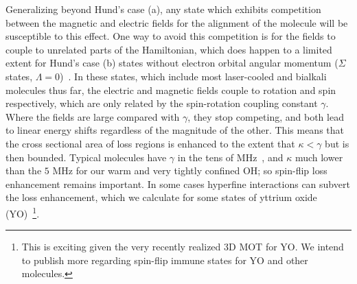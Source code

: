 \documentclass[%
 reprint,
 amsmath,amssymb,
 aps,
prl,
]{revtex4-1}
\begin{document}

%

Generalizing beyond Hund's case (a), any state which exhibits competition between the magnetic and electric fields for the alignment of the molecule will be susceptible to this effect. One way to avoid this competition is for the fields to couple to unrelated parts of the Hamiltonian, which does happen to a limited extent for Hund's case (b) states without electron orbital angular momentum ($\Sigma$ states, $\Lambda=0$)~\cite{Bohn2013}. In these states, which include most laser-cooled and bialkali molecules thus far, the electric and magnetic fields couple to rotation and spin respectively, which are only related by the spin-rotation coupling constant $\gamma$. Where the fields are large compared with $\gamma$, they stop competing, and both lead to linear energy shifts regardless of the magnitude of the other. This means that the cross sectional area of loss regions is enhanced to the extent that $\kappa<\gamma$ but is then bounded. Typical molecules have $\gamma$ in the tens of MHz~\cite{Quemener2016}, and $\kappa$ much lower than the $5\text{ MHz}$ for our warm and very tightly confined OH; so spin-flip loss enhancement remains important. In some cases hyperfine interactions can subvert the loss enhancement, which we calculate for some states of yttrium oxide (YO)~\footnote{This is exciting given the very recently realized 3D MOT for YO. We intend to publish more regarding spin-flip immune states for YO and other molecules.}. %


\end{document}
